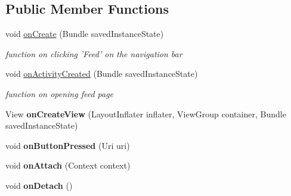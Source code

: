 \subsection*{Public Member Functions}
\begin{DoxyCompactItemize}
\item 
\hypertarget{classcom_1_1example_1_1sel_1_1lostfound_1_1FeedFragment_a027942ee12844b17c604195b91f9948d}{void \hyperlink{classcom_1_1example_1_1sel_1_1lostfound_1_1FeedFragment_a027942ee12844b17c604195b91f9948d}{on\-Create} (Bundle saved\-Instance\-State)}\label{classcom_1_1example_1_1sel_1_1lostfound_1_1FeedFragment_a027942ee12844b17c604195b91f9948d}

\begin{DoxyCompactList}\small\item\em function on clicking 'Feed' on the navigation bar \end{DoxyCompactList}\item 
void \hyperlink{classcom_1_1example_1_1sel_1_1lostfound_1_1FeedFragment_abb8194bc01339ece4f650c3b7e716a5f}{on\-Activity\-Created} (Bundle saved\-Instance\-State)
\begin{DoxyCompactList}\small\item\em function on opening feed page \end{DoxyCompactList}\item 
\hypertarget{classcom_1_1example_1_1sel_1_1lostfound_1_1FeedFragment_a4e2cc79785d7392af2839c0b3900b12b}{View {\bfseries on\-Create\-View} (Layout\-Inflater inflater, View\-Group container, Bundle saved\-Instance\-State)}\label{classcom_1_1example_1_1sel_1_1lostfound_1_1FeedFragment_a4e2cc79785d7392af2839c0b3900b12b}

\item 
\hypertarget{classcom_1_1example_1_1sel_1_1lostfound_1_1FeedFragment_a4a39372816f2c53d6ff1b3d12be98c23}{void {\bfseries on\-Button\-Pressed} (Uri uri)}\label{classcom_1_1example_1_1sel_1_1lostfound_1_1FeedFragment_a4a39372816f2c53d6ff1b3d12be98c23}

\item 
\hypertarget{classcom_1_1example_1_1sel_1_1lostfound_1_1FeedFragment_a63947b4cbebd081d42113ff157a2f6b0}{void {\bfseries on\-Attach} (Context context)}\label{classcom_1_1example_1_1sel_1_1lostfound_1_1FeedFragment_a63947b4cbebd081d42113ff157a2f6b0}

\item 
\hypertarget{classcom_1_1example_1_1sel_1_1lostfound_1_1FeedFragment_a1cc06e44e371cfc7f6b0bb5da15f78f0}{void {\bfseries on\-Detach} ()}\label{classcom_1_1example_1_1sel_1_1lostfound_1_1FeedFragment_a1cc06e44e371cfc7f6b0bb5da15f78f0}

\end{DoxyCompactItemize}
